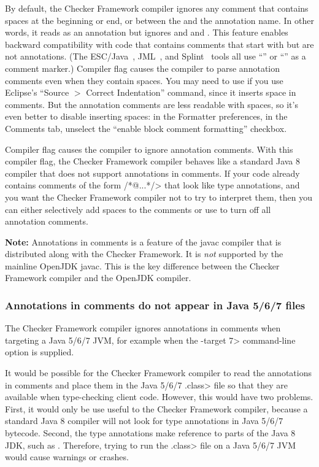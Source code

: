 By default, the Checker Framework compiler ignores any comment that contains spaces at the
beginning or end, or between the  and the annotation name.
In other words, it reads  as an annotation but ignores
 and  and .
This
feature enables backward compatibility with code that contains comments
that start with  but are not annotations.  (The
ESC/Java~\cite{FlanaganLLNSS02}, JML~\cite{LeavensBR2006:JML}, and
Splint~\cite{Evans96} tools all use ``'' or ``'' as a
comment marker.)
Compiler flag
 causes the compiler to parse annotation comments
even when they contain spaces.  You may need to use
 if you use Eclipse's ``Source $>$ Correct
Indentation'' command, since it inserts space in comments.  But the
annotation comments are less readable with spaces, so it's even better to disable
inserting spaces:  in the Formatter preferences, in the Comments tab,
unselect the ``enable block comment formatting'' checkbox.

Compiler flag  causes the compiler
to ignore annotation comments.  With this compiler flag, the 
Checker Framework compiler behaves like a standard Java 8 compiler that does
not support annotations in comments.  If your code already contains
comments of the form \</*@...*/> that look like type annotations, and
you want the Checker Framework compiler not to try to interpret them,
then you can either selectively add spaces to the comments or use
 to turn off all annotation
comments.

\textbf{Note:} Annotations in comments is a feature of the javac compiler
that is
distributed along with the Checker Framework.  It is \emph{not}
supported by the mainline OpenJDK javac.  This is the key
difference between the Checker Framework compiler and the OpenJDK compiler.


\subsubsection{Annotations in comments do not appear in Java 5/6/7  files\label{annotations-in-java7-class-files}}

The Checker Framework compiler ignores annotations in comments when
targeting a Java 5/6/7 JVM, for example when the \<-target 7> command-line
option is supplied.

It would be possible for the Checker Framework compiler to read the
annotations in comments and place them in the Java 5/6/7 \<.class> file so
that they are available when type-checking client code.  However, this
would have two problems.  First, it would only be use useful to the Checker
Framework compiler, because a standard Java 8 compiler will not look for
type annotations in Java 5/6/7 bytecode.  Second, the type annotations
make reference to parts of the Java 8 JDK, such as
.
Therefore, trying to run the \<.class> file on a Java 5/6/7 JVM
would cause warnings or crashes.


